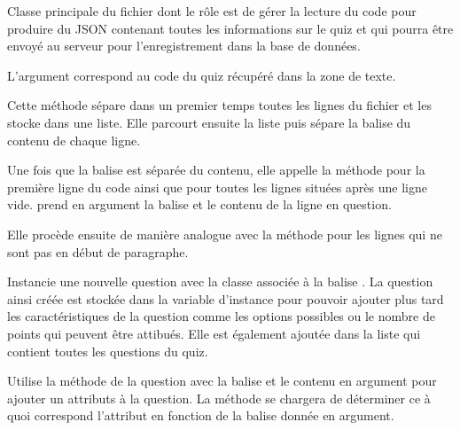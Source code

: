 \documentclass[a4paper,11pt,openany,oneside]{sphinxmanual}
\begin{document}
\begin{fulllineitems}
\label{front-end:Parse}
Classe principale du fichier dont le rôle est de gérer la lecture du code pour
produire du JSON contenant toutes les informations sur le quiz et qui pourra
être envoyé au serveur pour l'enregistrement dans la base de données.

L'argument  correspond au code du quiz récupéré dans la zone de texte.

\begin{fulllineitems}
\label{front-end:Parse.read}
Cette méthode sépare dans un premier temps toutes les lignes du fichier et
les stocke dans une liste. Elle parcourt ensuite la liste puis sépare
la balise du contenu de chaque ligne.

Une fois que la balise est séparée
du contenu, elle appelle la méthode  pour
la première ligne du code ainsi que pour toutes les lignes situées après
une ligne vide.  prend en argument la balise
et le contenu de la ligne en question.

Elle procède ensuite de manière analogue avec la méthode 
pour les lignes qui ne sont pas en début de paragraphe.

\end{fulllineitems}


\begin{fulllineitems}
\label{front-end:Parse.new_question}
Instancie une nouvelle question avec la classe associée à la balise .
La question ainsi créée est stockée dans la variable d'instance 
pour pouvoir ajouter plus tard les caractéristiques de la question comme
les options possibles ou le nombre de points qui peuvent être attibués.
Elle est également ajoutée dans la liste  qui contient
toutes les questions du quiz.

\end{fulllineitems}


\begin{fulllineitems}
\label{front-end:Parse.new_attribute}
Utilise la méthode  de la question 
avec la balise et le contenu en argument pour ajouter un attributs à la question.
La méthode  se chargera de déterminer ce à quoi correspond
l'attribut en fonction de la balise donnée en argument.


\end{fulllineitems}
\end{fulllineitems}
\end{document}
